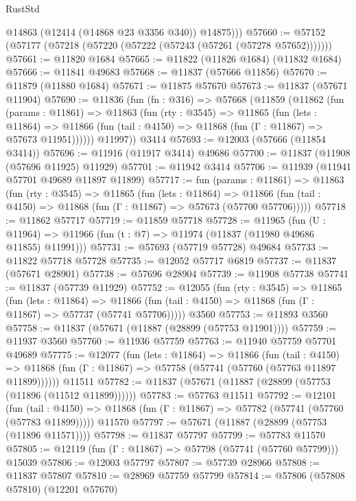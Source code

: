 \begin{lexlean}{RustStd}
\begin{coremodule}
{\begin{coremodule}
{{{{{{{{{{{{{{{{{{{{{{{{{{{{{{{{{{{{{{{{{{{{{{{{{{          @14863
          (@12414 (@14868 @23 @3356 @340))
          @14875)))
@57660 := @57152 (@57177 (@57218 (@57220 (@57222 (@57243 (@57261 (@57278 @57652)))))))
@57661 := @11820 @1684
@57665 := @11822 (@11826 @1684) (@11832 @1684)
@57666 := @11841 @49683
@57668 := @11837 (@57666 @11856)
@57670 := @11879 (@11880 @1684)
@57671 := @11875 @57670
@57673 := @11837 (@57671 @11904)
@57690 := @11836
    (fun (fn : @316) =>
    @57668
      (@11859
        (@11862
          (fun (params : @11861) =>
          @11863
            (fun (rty : @3545) =>
            @11865
              (fun (lets : @11864) =>
              @11866 (fun (tail : @4150) => @11868 (fun (Γ : @11867) => @57673 @11951))))))
        @11997))
    @3414
@57693 := @12003 (@57666 (@11854 @3414))
@57696 := @11916 (@11917 @3414) @49686
@57700 := @11837 (@11908 (@57696 @11925) @11929)
@57701 := @11942 @3414
@57706 := @11939 (@11941 @57701 @49689 @11897 @11899)
@57717 := fun (params : @11861) =>
  @11863
    (fun (rty : @3545) =>
    @11865
      (fun (lets : @11864) =>
      @11866 (fun (tail : @4150) => @11868 (fun (Γ : @11867) => @57673 (@57700 @57706)))))
@57718 := @11862 @57717
@57719 := @11859 @57718
@57728 := @11965
    (fun (U : @11964) => @11966 (fun (t : @7) => @11974 (@11837 (@11980 @49686 @11855) @11991)))
@57731 := @57693 (@57719 @57728) @49684
@57733 := @11822 @57718 @57728
@57735 := @12052 @57717 @6819
@57737 := @11837 (@57671 @28901)
@57738 := @57696 @28904
@57739 := @11908 @57738
@57741 := @11837 (@57739 @11929)
@57752 := @12055
    (fun (rty : @3545) =>
    @11865
      (fun (lets : @11864) =>
      @11866 (fun (tail : @4150) => @11868 (fun (Γ : @11867) => @57737 (@57741 @57706)))))
    @3560
@57753 := @11893 @3560
@57758 := @11837 (@57671 (@11887 (@28899 (@57753 @11901))))
@57759 := @11937 @3560
@57760 := @11936 @57759
@57763 := @11940 @57759 @57701 @49689
@57775 := @12077
    (fun (lets : @11864) =>
    @11866
      (fun (tail : @4150) =>
      @11868 (fun (Γ : @11867) => @57758 (@57741 (@57760 (@57763 @11897 @11899))))))
    @11511
@57782 := @11837 (@57671 (@11887 (@28899 (@57753 (@11896 (@11512 @11899))))))
@57783 := @57763 @11511
@57792 := @12101
    (fun (tail : @4150) => @11868 (fun (Γ : @11867) => @57782 (@57741 (@57760 (@57783 @11899)))))
    @11570
@57797 := @57671 (@11887 (@28899 (@57753 (@11896 @11571))))
@57798 := @11837 @57797
@57799 := @57783 @11570
@57805 := @12119 (fun (Γ : @11867) => @57798 (@57741 (@57760 @57799))) @15039
@57806 := @12003 @57797
@57807 := @57739 @28966
@57808 := @11837 @57807
@57810 := @28969 @57759 @57799
@57814 := @57806 (@57808 @57810) (@12201 @57670)
}}}}}}}}}}}}}}}}}}}}}}}}}}}}}}}}}}}}}}}}}}}}}}}}}}
\end{coremodule}}
\end{coremodule}
\end{lexlean}
